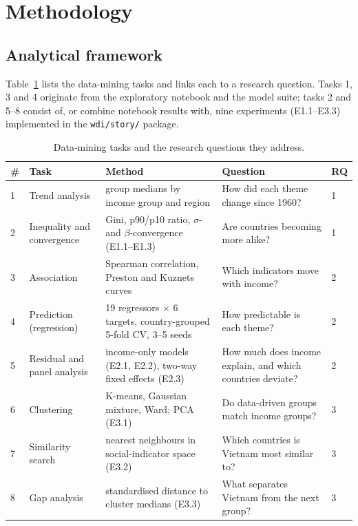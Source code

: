 \documentclass[11pt,a4paper]{article}
\begin{document}
\section{Methodology}\label{sec:method}

\subsection{Analytical framework}
Table~\ref{tab:actions} lists the data-mining tasks and links each to a research question. Tasks 1, 3 and 4 originate from the exploratory notebook and the model suite; tasks 2 and 5--8 consist of, or combine notebook results with, nine experiments (E1.1--E3.3) implemented in the \texttt{wdi/story/} package.

\begin{table}[htbp]\centering\small
\caption{Data-mining tasks and the research questions they address.}\label{tab:actions}
\begin{tabular}{p{0.4cm}p{3.3cm}p{4.9cm}p{4.6cm}p{0.8cm}}
\toprule
\# & Task & Method & Question & RQ \\
\midrule
1 & Trend analysis & group medians by income group and region & How did each theme change since 1960? & 1 \\
2 & Inequality and convergence & Gini, p90/p10 ratio, $\sigma$- and $\beta$-convergence (E1.1--E1.3) & Are countries becoming more alike? & 1 \\
3 & Association & Spearman correlation, Preston and Kuznets curves & Which indicators move with income? & 2 \\
4 & Prediction (regression) & 19 regressors $\times$ 6 targets, country-grouped 5-fold CV, 3--5 seeds & How predictable is each theme? & 2 \\
5 & Residual and panel analysis & income-only models (E2.1, E2.2), two-way fixed effects (E2.3) & How much does income explain, and which countries deviate? & 2 \\
6 & Clustering & K-means, Gaussian mixture, Ward; PCA (E3.1) & Do data-driven groups match income groups? & 3 \\
7 & Similarity search & nearest neighbours in social-indicator space (E3.2) & Which countries is Vietnam most similar to? & 3 \\
8 & Gap analysis & standardised distance to cluster medians (E3.3) & What separates Vietnam from the next group? & 3 \\
\bottomrule
\end{tabular}
\end{table}
\end{document}
